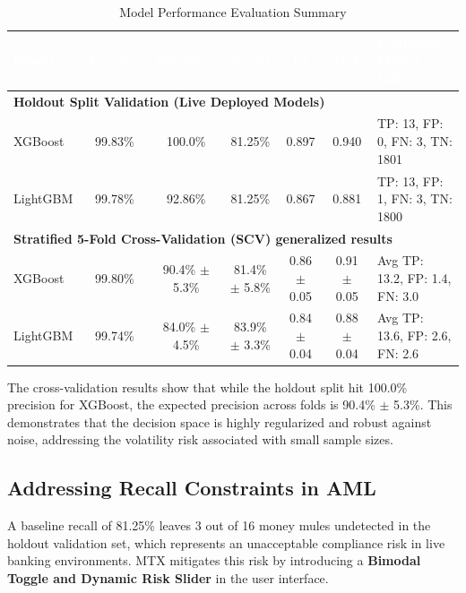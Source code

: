 \documentclass[11pt,a4paper]{article}
\begin{document}
\begin{table}[htbp]
\caption{Model Performance Evaluation Summary}
\label{table:eval}
\centering
\footnotesize %
\begin{tabularx}{\textwidth}{lcccccX}
\hline
\rowcolor{navy} \textcolor{white}{\textbf{Model}} & \textcolor{white}{\textbf{Accuracy}} & \textcolor{white}{\textbf{Precision}} & \textcolor{white}{\textbf{Recall}} & \textcolor{white}{\textbf{F1}} & \textcolor{white}{\textbf{AUC}} & \textcolor{white}{\textbf{Confusion Matrix / Info}} \\
\hline
\multicolumn{7}{l}{\textbf{Holdout Split Validation (Live Deployed Models)}} \\
\hline
XGBoost & 99.83\% & 100.0\% & 81.25\% & 0.897 & 0.940 & TP: 13, FP: 0, FN: 3, TN: 1801 \\
\rowcolor{tablerowgray}
LightGBM & 99.78\% & 92.86\% & 81.25\% & 0.867 & 0.881 & TP: 13, FP: 1, FN: 3, TN: 1800 \\
\hline
\multicolumn{7}{l}{\textbf{Stratified 5-Fold Cross-Validation (SCV) generalized results}} \\
\hline
XGBoost & 99.80\% & 90.4\% $\pm$ 5.3\% & 81.4\% $\pm$ 5.8\% & 0.86 $\pm$ 0.05 & 0.91 $\pm$ 0.05 & Avg TP: 13.2, FP: 1.4, FN: 3.0 \\
\rowcolor{tablerowgray}
LightGBM & 99.74\% & 84.0\% $\pm$ 4.5\% & 83.9\% $\pm$ 3.3\% & 0.84 $\pm$ 0.04 & 0.88 $\pm$ 0.04 & Avg TP: 13.6, FP: 2.6, FN: 2.6 \\
\hline
\end{tabularx}
\end{table}

The cross-validation results show that while the holdout split hit 100.0\% precision for XGBoost, the expected precision across folds is 90.4\% $\pm$ 5.3\%. This demonstrates that the decision space is highly regularized and robust against noise, addressing the volatility risk associated with small sample sizes.

\subsection{Addressing Recall Constraints in AML}
A baseline recall of 81.25\% leaves 3 out of 16 money mules undetected in the holdout validation set, which represents an unacceptable compliance risk in live banking environments. MTX mitigates this risk by introducing a \textbf{Bimodal Toggle and Dynamic Risk Slider} in the user interface. 
\end{document}
